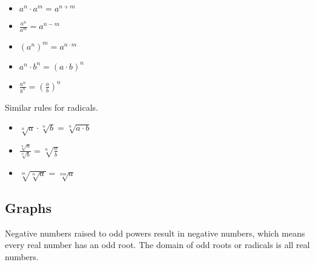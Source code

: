 \documentclass{ximera}
\begin{document}
\begin{itemize}
\item $a^n \cdot a^m = a^{n+m}$

\item $\frac{a^n}{a^m} = a^{n-m}$

\item $(a^n)^m = a^{n \cdot m}$

\item $a^n \cdot b^n = (a \cdot b)^n$

\item $\frac{a^n}{b^n} = \left(\frac{a}{b}\right)^n$


\end{itemize}



Similar rules for radicals.

\begin{itemize}

\item $\sqrt[n]{a} \cdot \sqrt[n]{b} = \sqrt[n]{a \cdot b}$

\item $\frac{\sqrt[n]{a}}{\sqrt[n]{b}} = \sqrt[n]{\frac{a}{b}}$

\item $\sqrt[m]{\sqrt[n]{a}} = \sqrt[nm]{a}$

\end{itemize}






\subsection{Graphs}



Negative numbers raised to odd powers result in negative numbers, which means every real number has an odd root.  The domain of odd roots or radicals is all real numbers.
\end{document}
